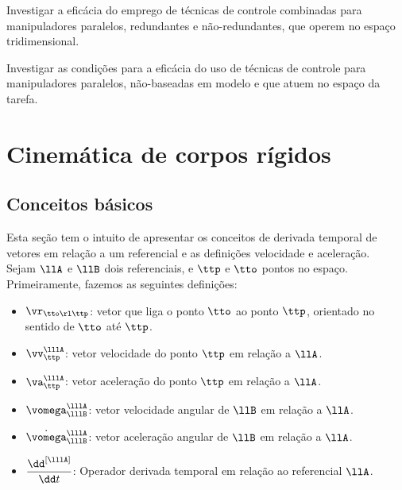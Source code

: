 \documentclass[]{politex}
\begin{document}
Investigar a eficácia do emprego de técnicas de controle combinadas para manipuladores paralelos, redundantes e não-redundantes, que operem no espaço tridimensional.

\vspace{0.3cm}

Investigar as condições para a eficácia do uso de técnicas de controle para manipuladores paralelos, não-baseadas em modelo e que atuem no espaço da tarefa.





%






\apendice

\chapter{Cinemática de corpos rígidos} \label{apendiceA}

\section{Conceitos básicos}\label{S05-01-01}

Esta seção tem o intuito de apresentar os conceitos de derivada temporal de vetores em relação a um referencial e as definições velocidade e aceleração. \\

Sejam $\llA$ e $\llB$ dois referenciais, e $\ttp$ e $\tto$ pontos no espaço. Primeiramente, fazemos as seguintes definições:

\begin{itemize}
\item $\vr_{\tto \rl \ttp}$: vetor que liga o ponto $\tto$ ao ponto $\ttp$, orientado no sentido de $\tto$ até $\ttp$.
\item $\vv_{\ttp}^{\lllA}$: vetor velocidade do ponto $\ttp$ em relação a $\llA$.
\item $\va_{\ttp}^{\lllA}$: vetor acelera\c{c}\~ao do ponto $\ttp$ em relação a $\llA$.
\item $\vomega_{\lllB}^{\lllA}$: vetor velocidade angular de $\llB$ em relação a $\llA$.
\item $\dot{\vomega}_{\lllB}^{\lllA}$: vetor aceleração angular de $\llB$ em relação a $\llA$.
\item $\displaystyle\frac{\dd^{[\lllA]}}{\dd t}$: Operador derivada temporal em relação ao referencial $\llA$.
\end{itemize}
\end{document}
